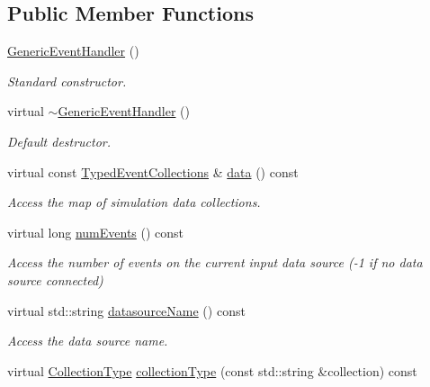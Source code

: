 \subsection*{Public Member Functions}
\begin{DoxyCompactItemize}
\item 
\hyperlink{class_d_d4hep_1_1_generic_event_handler_aef493617474019a953be658fdec60edc}{Generic\+Event\+Handler} ()
\begin{DoxyCompactList}\small\item\em Standard constructor. \end{DoxyCompactList}\item 
virtual \hyperlink{class_d_d4hep_1_1_generic_event_handler_a2e5420d14f01ae34c9a0a670a374cf71}{$\sim$\+Generic\+Event\+Handler} ()
\begin{DoxyCompactList}\small\item\em Default destructor. \end{DoxyCompactList}\item 
virtual const \hyperlink{class_d_d4hep_1_1_event_handler_a4d441ff8a824b1e2f278e8b7a6391af3}{Typed\+Event\+Collections} \& \hyperlink{class_d_d4hep_1_1_generic_event_handler_ad4d0029a1db989c61a3bbb72f299f12e}{data} () const
\begin{DoxyCompactList}\small\item\em Access the map of simulation data collections. \end{DoxyCompactList}\item 
virtual long \hyperlink{class_d_d4hep_1_1_generic_event_handler_a05d0623b58211c6d941aea1377771a2b}{num\+Events} () const
\begin{DoxyCompactList}\small\item\em Access the number of events on the current input data source (-\/1 if no data source connected) \end{DoxyCompactList}\item 
virtual std\+::string \hyperlink{class_d_d4hep_1_1_generic_event_handler_a3d99aeaf1bcd8aa421ecab3bcf5fabe0}{datasource\+Name} () const
\begin{DoxyCompactList}\small\item\em Access the data source name. \end{DoxyCompactList}\item 
virtual \hyperlink{class_d_d4hep_1_1_event_handler_a0b22a141a019364495835317fad48254}{Collection\+Type} \hyperlink{class_d_d4hep_1_1_generic_event_handler_aeb30b8fc7e8e850fa7472fc70443b817}{collection\+Type} (const std\+::string \&collection) const

\end{DoxyCompactItemize}

